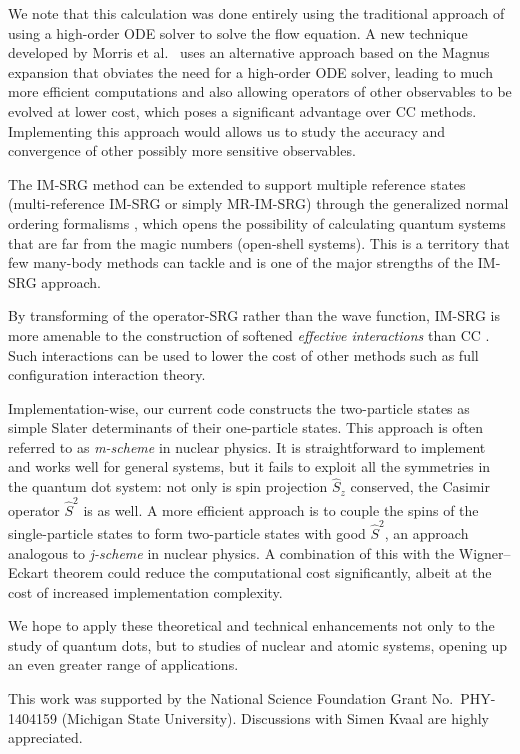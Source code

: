 We note that this calculation was done entirely using the traditional approach of using a high-order ODE solver to solve the flow equation.  A new technique developed by Morris et al.\ \cite{PhysRevC.92.034331} uses an alternative approach based on the Magnus expansion that obviates the need for a high-order ODE solver, leading to much more efficient computations and also allowing operators of other observables to be evolved at lower cost, which poses a significant advantage over CC methods.  Implementing this approach would allows us to study the accuracy and convergence of other possibly more sensitive observables.

The IM-SRG method can be extended to support multiple reference states (multi-reference IM-SRG or simply MR-IM-SRG) \cite{PhysRevLett.110.242501,PhysRevC.90.041302} through the generalized normal ordering formalisms \cite{doi:10.1063/1.474405}, which opens the possibility of calculating quantum systems that are far from the magic numbers (open-shell systems).  This is a territory that few many-body methods can tackle and is one of the major strengths of the IM-SRG approach.

By transforming of the operator-SRG rather than the wave function, IM-SRG is more amenable to the construction of softened \textit{effective interactions} than CC \cite{Hergert2016165}.  Such interactions can be used to lower the cost of other methods such as full configuration interaction theory.

Implementation-wise, our current code constructs the two-particle states as simple Slater determinants of their one-particle states.  This approach is often referred to as \textit{m-scheme} in nuclear physics.  It is straightforward to implement and works well for general systems, but it fails to exploit all the symmetries in the quantum dot system: not only is spin projection $\hat S_z$ conserved, the Casimir operator $\hat S^2$ is as well.  A more efficient approach is to couple the spins of the single-particle states to form two-particle states with good $\hat S^2$, an approach analogous to \textit{j-scheme} in nuclear physics.  A combination of this with the Wigner--Eckart theorem could reduce the computational cost significantly, albeit at the cost of increased implementation complexity.

We hope to apply these theoretical and technical enhancements not only to the study of quantum dots, but to studies of nuclear and atomic systems, opening up an even greater range of applications.

\begin{acknowledgments}
  This work was supported by the National Science Foundation Grant No.\ PHY-1404159 (Michigan State University).  Discussions with Simen Kvaal are highly appreciated.
\end{acknowledgments}




